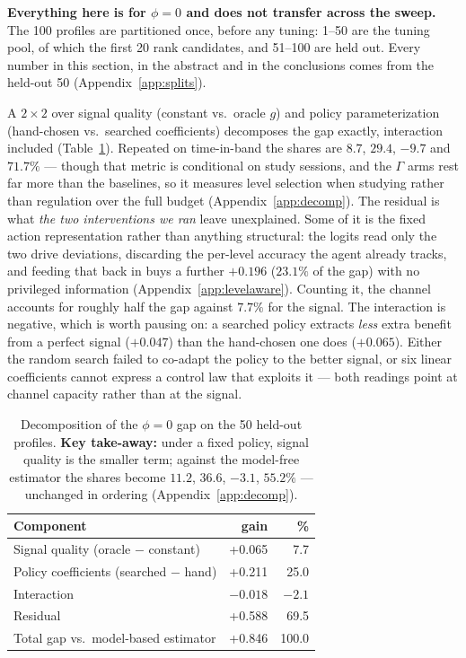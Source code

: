 \documentclass{article}
\begin{document}
\textbf{Everything here is for $\phi{=}0$ and does not transfer across the sweep.} The 100 profiles are partitioned once, before any tuning: 1--50 are the tuning pool, of which the first 20 rank candidates, and 51--100 are held out. Every number in this section, in the abstract and in the conclusions comes from the held-out 50 (Appendix~\ref{app:splits}).

A $2{\times}2$ over signal quality (constant vs.\ oracle $g$) and policy parameterization (hand-chosen vs.\ searched coefficients) decomposes the gap exactly, interaction included (Table~\ref{tab:decomp}). Repeated on time-in-band the shares are $8.7$, $29.4$, $-9.7$ and $71.7\%$ --- though that metric is conditional on study sessions, and the $\Gamma$ arms rest far more than the baselines, so it measures level selection when studying rather than regulation over the full budget (Appendix~\ref{app:decomp}). The residual is what \emph{the two interventions we ran} leave unexplained. Some of it is the fixed action representation rather than anything structural: the logits read only the two drive deviations, discarding the per-level accuracy the agent already tracks, and feeding that back in buys a further $+0.196$ ($23.1\%$ of the gap) with no privileged information (Appendix~\ref{app:levelaware}). Counting it, the channel accounts for roughly half the gap against $7.7\%$ for the signal. The interaction is negative, which is worth pausing on: a searched policy extracts \emph{less} extra benefit from a perfect signal ($+0.047$) than the hand-chosen one does ($+0.065$). Either the random search failed to co-adapt the policy to the better signal, or six linear coefficients cannot express a control law that exploits it --- both readings point at channel capacity rather than at the signal.


\begin{table}[t]
  \caption{Decomposition of the $\phi{=}0$ gap on the 50 held-out profiles. \textbf{Key take-away:} under a fixed policy, signal quality is the smaller term; against the model-free estimator the shares become $11.2$, $36.6$, $-3.1$, $55.2\%$ --- unchanged in ordering (Appendix~\ref{app:decomp}).}
  \label{tab:decomp}
  \centering\small
  \begin{tabular}{lrr}
    \toprule
    Component & gain & \% \\
    \midrule
    Signal quality (oracle $-$ constant) & +0.065 & 7.7 \\
    Policy coefficients (searched $-$ hand) & +0.211 & 25.0 \\
    Interaction & $-0.018$ & $-2.1$ \\
    Residual & +0.588 & 69.5 \\
    \midrule
    Total gap vs.\ model-based estimator & +0.846 & 100.0 \\
    \bottomrule
  \end{tabular}
\end{table}
\end{document}
